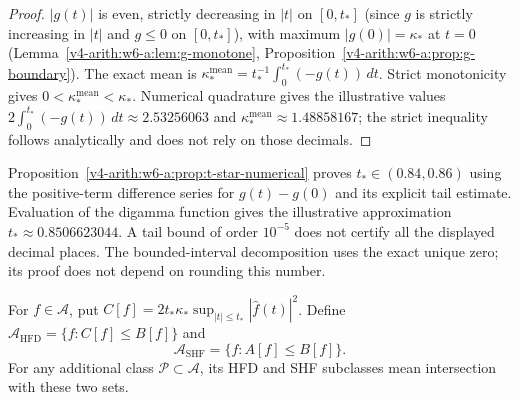 \begin{proof}
\(|g(t)|\) is even, strictly decreasing in \(|t|\) on \([0,t_{\ast}]\)
(since \(g\) is strictly increasing in \(|t|\) and \(g\leq 0\) on
\([0,t_{\ast}]\)), with maximum \(|g(0)|=\kappa_{\ast}\) at \(t=0\)
(Lemma~\ref{v4-arith:w6-a:lem:g-monotone},
Proposition~\ref{v4-arith:w6-a:prop:g-boundary}). The exact mean is
\(\kappa_*^{\mathrm{mean}}=t_*^{-1}\int_0^{t_*}(-g(t))\,dt\).
Strict monotonicity gives \(0<\kappa_*^{\mathrm{mean}}<\kappa_*\).
Numerical quadrature gives the illustrative values
\(2\int_0^{t_*}(-g(t))\,dt\approx2.53256063\) and
\(\kappa_*^{\mathrm{mean}}\approx1.48858167\); the strict inequality
follows analytically and does not rely on those decimals.
\end{proof}

\begin{remark}
\label{v4-arith:w7-a:rem:t-star-corrected}
Proposition~\ref{v4-arith:w6-a:prop:t-star-numerical} proves
\(t_*\in(0.84,0.86)\) using the positive-term difference series
for \(g(t)-g(0)\) and its explicit tail estimate. Evaluation of the
digamma function gives the illustrative approximation
\(t_*\approx0.8506623044\). A tail bound of order \(10^{-5}\)
does not certify all the displayed decimal places.
The bounded-interval decomposition uses the exact unique zero;
its proof does not depend on rounding this number.
\end{remark}

\begin{definition}
\label{v4-arith:w7-a:def:SHF-class}
For \(f\in\mathscr A\), put
\(C[f]=2t_*\kappa_*\sup_{|t|\le t_*}|\widehat f(t)|^2\).
Define \(\mathscr A_{\mathrm{HFD}}=\{f:C[f]\le B[f]\}\) and
\begin{equation}
\label{v4-arith:w7-a:eq:SHF-condition}
 \mathscr A_{\mathrm{SHF}}=\{f:A[f]\le B[f]\}.
\end{equation}
For any additional class \(\mathcal P\subset\mathscr A\), its
HFD and SHF subclasses mean intersection with these two sets.
\end{definition}

